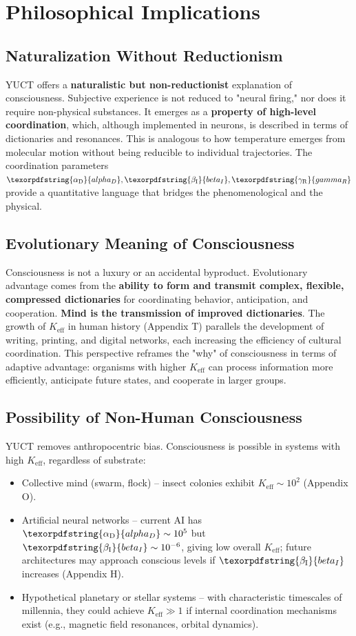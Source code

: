 \documentclass[12pt,a4paper]{article}
\DeclareRobustCommand{\alD}{\texorpdfstring{\ensuremath{\alpha_{\mathrm{D}}}}{alpha_D}}
\DeclareRobustCommand{\beI}{\texorpdfstring{\ensuremath{\beta_{\mathrm{I}}}}{beta_I}}
\DeclareRobustCommand{\gaR}{\texorpdfstring{\ensuremath{\gamma_{\mathrm{R}}}}{gamma_R}}
\newcommand{\eff}{\mathrm{eff}}
\newcommand{\Ke}{K_{\eff}}
\begin{document}
	\section{Philosophical Implications}
	
	\subsection{Naturalization Without Reductionism}
	
	YUCT offers a \textbf{naturalistic but non-reductionist} explanation of consciousness. Subjective experience is not reduced to "neural firing," nor does it require non-physical substances. It emerges as a \textbf{property of high-level coordination}, which, although implemented in neurons, is described in terms of dictionaries and resonances. This is analogous to how temperature emerges from molecular motion without being reducible to individual trajectories. The coordination parameters \(\alD, \beI, \gaR\) provide a quantitative language that bridges the phenomenological and the physical.
	
	\subsection{Evolutionary Meaning of Consciousness}
	
	Consciousness is not a luxury or an accidental byproduct. Evolutionary advantage comes from the \textbf{ability to form and transmit complex, flexible, compressed dictionaries} for coordinating behavior, anticipation, and cooperation. \textbf{Mind is the transmission of improved dictionaries}. The growth of $\Ke$ in human history (Appendix T) parallels the development of writing, printing, and digital networks, each increasing the efficiency of cultural coordination. This perspective reframes the "why" of consciousness in terms of adaptive advantage: organisms with higher $\Ke$ can process information more efficiently, anticipate future states, and cooperate in larger groups.
	
	\subsection{Possibility of Non-Human Consciousness}
	
	YUCT removes anthropocentric bias. Consciousness is possible in systems with high $\Ke$, regardless of substrate:
	\begin{itemize}
		\item Collective mind (swarm, flock) – insect colonies exhibit $\Ke \sim 10^2$ (Appendix O).
		\item Artificial neural networks – current AI has $\alD \sim 10^5$ but $\beI \sim 10^{-6}$, giving low overall $\Ke$; future architectures may approach conscious levels if $\beI$ increases (Appendix H).
		\item Hypothetical planetary or stellar systems – with characteristic timescales of millennia, they could achieve $\Ke \gg 1$ if internal coordination mechanisms exist (e.g., magnetic field resonances, orbital dynamics).
	\end{itemize}
	
\end{document}
